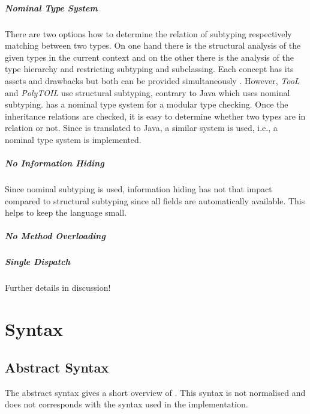 \paragraph{Nominal Type System}
There are two options how to determine the relation of subtyping
respectively matching between two types. On one hand there is the structural
analysis of the given types in the current context and on the other there
is the analysis of the type hierarchy and restricting subtyping and
subclassing. Each concept has its assets and drawbacks but both can
be provided simultaneously \cite{malayeri_integrating_2008}. However,
\emph{TooL} and \emph{PolyTOIL} use structural subtyping, contrary to
Java which uses nominal subtyping. \ooplss has a nominal type system
for a modular type checking. Once the inheritance relations are checked,
it is easy to determine whether two types are in relation or not. Since
\ooplss is translated to Java, a similar system is used, i.e., a nominal
type system is implemented.

\paragraph{No Information Hiding}
Since nominal subtyping is used, information hiding has not that impact
compared to structural subtyping since all fields are automatically
available. This helps to keep the language small.

\paragraph{No Method Overloading}

\paragraph{Single Dispatch}

Further details in discussion!

\chapter{Syntax}
\section{Abstract Syntax}
The abstract syntax gives a short overview of \ooplss. This syntax is
not normalised and does not corresponds with the syntax used in the
implementation.\\

